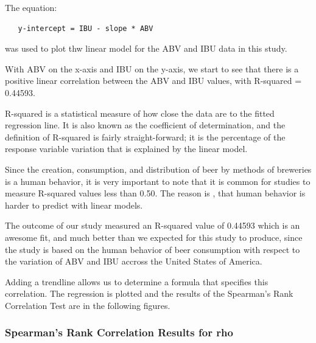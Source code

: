 \documentclass[]{article}
\newenvironment{Shaded}{\begin{snugshade}}{\end{snugshade}}
\newcommand{\DecValTok}[1]{\textcolor[rgb]{0.00,0.00,0.81}{#1}}
\newcommand{\FloatTok}[1]{\textcolor[rgb]{0.00,0.00,0.81}{#1}}
\newcommand{\StringTok}[1]{\textcolor[rgb]{0.31,0.60,0.02}{#1}}
\newcommand{\OperatorTok}[1]{\textcolor[rgb]{0.81,0.36,0.00}{\textbf{#1}}}
\newcommand{\NormalTok}[1]{#1}
\begin{document}
The equation:

\begin{verbatim}
   y-intercept = IBU - slope * ABV       
\end{verbatim}

was used to plot thw linear model for the ABV and IBU data in this
study.

With ABV on the x-axis and IBU on the y-axis, we start to see that there
is a positive linear correlation between the ABV and IBU values, with
R-squared = 0.44593.

R-squared is a statistical measure of how close the data are to the
fitted regression line. It is also known as the coefficient of
determination, and the definition of R-squared is fairly
straight-forward; it is the percentage of the response variable
variation that is explained by the linear model.

Since the creation, consumption, and distribution of beer by methods of
breweries is a human behavior, it is very important to note that it is
common for studies to measure R-squared values less than 0.50. The
reason is , that human behavior is harder to predict with linear models.

The outcome of our study measured an R-squared value of 0.44593 which is
an awesome fit, and much better than we expected for this study to
produce, since the study is based on the human behavior of beer
consumption with respect to the variation of ABV and IBU accross the
United States of America.

Adding a trendline allows us to determine a formula that specifies this
correlation. The regression is plotted and the results of the Spearman's
Rank Correlation Test are in the following figures.

\subsubsection{Spearman's Rank Correlation Results for
rho}\label{spearmans-rank-correlation-results-for-rho}

\begin{Shaded}
\end{Shaded}
\end{document}
